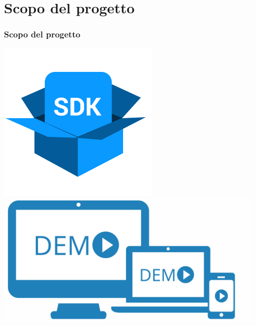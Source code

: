 \section{Scopo del progetto}
\begin{frame}
	\frametitle{Scopo del progetto}
    \begin{center}
        \includegraphics[scale=0.35]{img/sdk.png} \\
        \includegraphics[scale=0.15]{img/demo.png}
    \end{center}
\end{frame}

